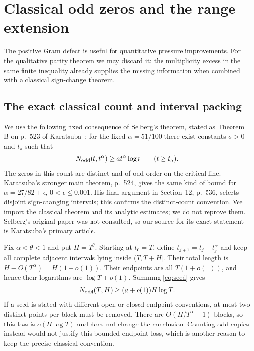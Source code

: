 \documentclass[11pt]{article}
\theoremstyle{remark}
\begin{document}
\section{Classical odd zeros and the range extension}\label{sec:parityproof}

The positive Gram defect is useful for quantitative pressure improvements.
For the qualitative parity theorem we may discard it: the multiplicity
excess in the same finite inequality already supplies the missing
information when combined with a classical sign-change theorem.

\subsection{The exact classical count and interval packing}

We use the following fixed consequence of Selberg's theorem, stated as
Theorem B on p.~523 of Karatsuba~\cite{Karatsuba}: for the fixed
$\alpha=51/100$ there exist constants $a>0$ and $t_a$ such that
\begin{equation}\label{eq:seed}
 N_{\rm odd}(t,t^\alpha)\ge a t^\alpha\log t\qquad(t\ge t_a).
\end{equation}
The zeros in this count are distinct and of odd order on the critical
line. Karatsuba's stronger main theorem, p.~524, gives the same kind of
bound for $\alpha=27/82+\epsilon$, $0<\epsilon\le0.001$. His final
argument in Section~12, p.~536, selects disjoint sign-changing intervals;
this confirms the distinct-count convention. We import the classical
theorem and its analytic estimates; we do not reprove them. Selberg's
original paper was not consulted, so our source for its exact statement
is Karatsuba's primary article.

Fix $\alpha<\theta<1$ and put $H=T^\theta$. Starting at $t_0=T$, define
$t_{j+1}=t_j+t_j^\alpha$ and keep all complete adjacent intervals lying
inside $(T,T+H]$. Their total length is $H-O(T^\alpha)=H(1-o(1))$.
Their endpoints are all $T(1+o(1))$, and hence their logarithms are
$\log T+o(1)$. Summing \eqref{eq:seed} gives
\begin{equation}\label{eq:packedodd}
 N_{\rm odd}(T,H)\ge (a+o(1))H\log T.
\end{equation}
If a seed is stated with different open or closed endpoint conventions,
at most two distinct points per block must be removed. There are
$O(H/T^\alpha+1)$ blocks, so this loss is $o(H\log T)$ and does not
change the conclusion. Counting odd copies instead would not justify
this bounded endpoint loss, which is another reason to keep the precise
classical convention.
\end{document}
